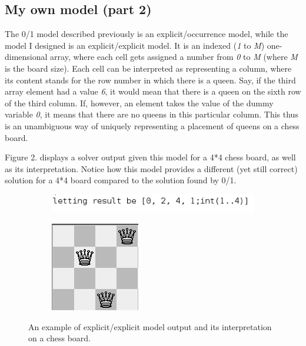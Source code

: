 \documentclass{report}
\newcommand{\tab}{\hspace*{1.5em}}
\begin{document}
\subsection*{My own	model (part 2)}
\tab The 0/1 model described previously is an explicit/occurrence model, while the model I designed is an explicit/explicit model. It is an indexed (\textit{1} to \textit{M}) one-dimensional array, where each cell gets assigned a number from \textit{0} to \textit{M} (where \textit{M} is the board size). Each cell can be interpreted as representing a column, where its content stands for the row number in which there is a queen. Say, if the third array element had a value \textit{6}, it would mean that there is a queen on the sixth row of the third column. If, however, an element takes the value of the dummy variable \textit{0}, it means that there are no queens in this particular column. This thus is an unambiguous way of uniquely representing a placement of queens on a chess board.

Figure 2. displays a solver output given this model for a 4*4 chess board, as well as its interpretation. Notice how this model provides a different (yet still correct) solution for a 4*4 board compared to the solution found by 0/1.

\begin{figure}
\begin{subfigure}{.5\textwidth}
\includegraphics[scale=0.65]{images/p2.png}
  \label{fig:sub1}
\end{subfigure}%
\begin{subfigure}{.5\textwidth}
\hspace{3cm}
\includegraphics[scale=0.65]{images/p2_vis.png}
  \label{fig:sub2}
\end{subfigure}
\caption{An example of explicit/explicit model output and its interpretation on a chess board.}
\label{fig:test}
\end{figure}
\end{document}
